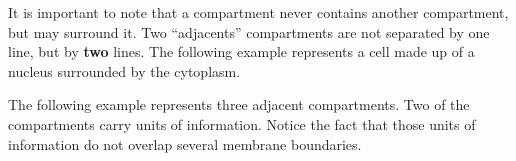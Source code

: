 It is important to note that a compartment never contains another compartment, but may surround it. Two ``adjacents'' compartments are not separated by one line, but by \textbf{two} lines. The following example represents a cell made up of a nucleus surrounded by the cytoplasm.

\begin{center}
\end{center}

The following example represents three adjacent compartments. Two of the compartments carry units of information. Notice the fact that those units of information do not overlap several membrane boundaries.

\begin{center}
\end{center}

